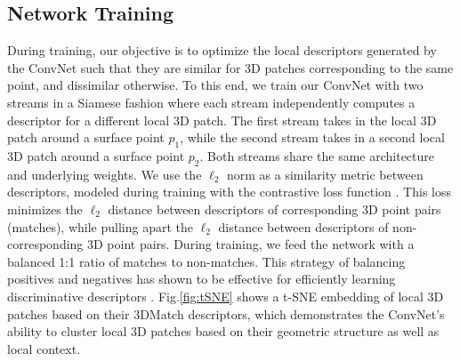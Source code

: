 \documentclass[10pt,twocolumn,letterpaper]{article}
\begin{document}
\subsection{Network Training}
During training, our objective is to optimize the local descriptors generated by the ConvNet such that they are similar for 3D patches corresponding to the same point, and dissimilar otherwise. To this end, we train our ConvNet with two streams in a Siamese fashion where each stream independently computes a descriptor for a different local 3D patch. The first stream takes in the local 3D patch around a surface point $p_1$, while the second stream takes in a second local 3D patch around a surface point $p_2$. Both streams share the same architecture and underlying weights.
We use the $\ell_2$ norm as a similarity metric between descriptors, modeled during training with the contrastive loss function \cite{chopra2005learning}.
This loss minimizes the $\ell_2$ distance between descriptors of corresponding 3D point pairs (matches), while pulling apart the $\ell_2$ distance between descriptors of non-corresponding 3D point pairs. During training, we feed the network with a balanced 1:1 ratio of matches to non-matches. This strategy of balancing positives and negatives has shown to be effective for efficiently learning discriminative descriptors \cite{han2015matchnet,simo2015discriminative,yi2016lift}.
Fig.\ref{fig:tSNE} shows a t-SNE embedding \cite{van2008visualizing} of local 3D patches based on their 3DMatch descriptors, which demonstrates the ConvNet's ability to cluster local 3D patches based on their geometric structure as well as local context.
\end{document}
